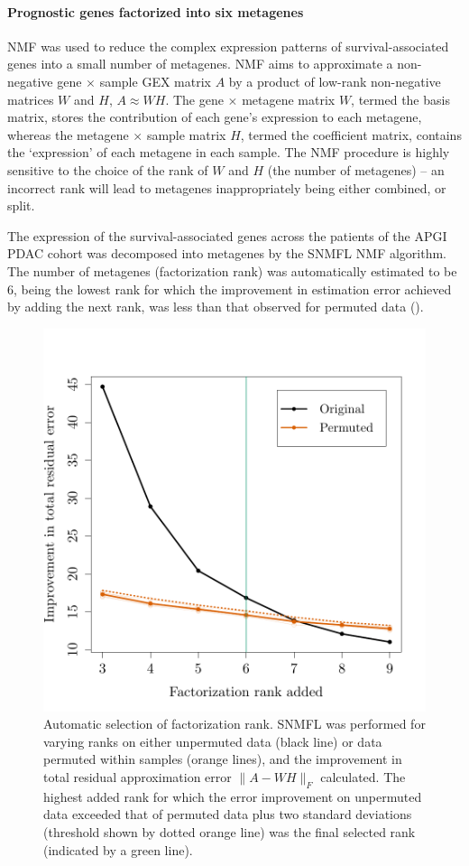\documentclass[dissertation.tex]{subfiles}
\begin{document}
\paragraph{Prognostic genes factorized into six metagenes}
\gls{NMF} was used to reduce the complex expression patterns of  survival-associated genes into a small number of metagenes.  \gls{NMF} aims to approximate a non-negative gene $\times$ sample \gls{GEX} matrix $A$ by a product of low-rank non-negative matrices $W$ and $H$, $A \approx W H$.  The gene $\times$ metagene matrix $W$, termed the basis matrix, stores the contribution of each gene's expression to each metagene, whereas the metagene $\times$ sample matrix $H$, termed the coefficient matrix, contains the `expression' of each metagene in each sample.  The \gls{NMF} procedure is highly sensitive to the choice of the rank of $W$ and $H$ (the number of metagenes) -- an incorrect rank will lead to metagenes inappropriately being either combined, or split.

The expression of the  survival-associated genes across the  patients of the \gls{APGI} \gls{PDAC} cohort was decomposed into metagenes by the \gls{SNMFL} \gls{NMF} algorithm.  The number of metagenes (factorization rank) was automatically estimated to be 6, being the lowest rank for which the improvement in estimation error achieved by adding the next rank, was less than that observed for permuted data ().

\begin{figure}[!htbp]
\centering
\includegraphics[width=.7\linewidth]{analysis/biosurv/reports/18_SIS_diag_dsd_final/figure/nmf-rank-plots-2}
\caption[Automatic selection of \texorpdfstring{\acrshort{NMF}}{NMF} factorization rank]{Automatic selection of factorization rank.  \acrshort{SNMFL} was performed for varying ranks on either unpermuted data (black line) or data permuted within samples (orange lines), and the improvement in total residual approximation error $\|A - W H\|_F$ calculated.  The highest added rank for which the error improvement on unpermuted data exceeded that of permuted data plus two standard deviations (threshold shown by dotted orange line) was the final selected rank (indicated by a green line).}\label{fig:sigs-nmf-rank}
\end{figure}
\end{document}
